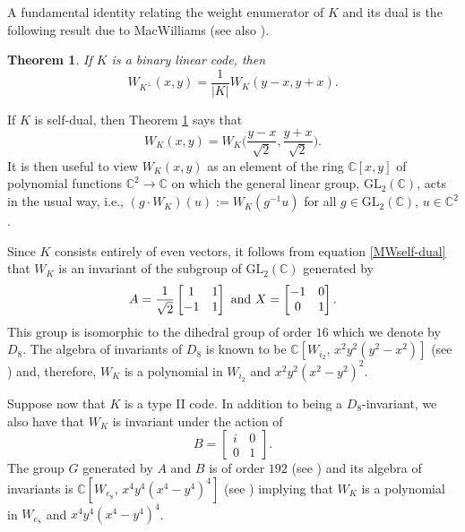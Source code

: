 \documentclass[a4paper,reqno]{amsart}
\newcommand{\bydef}{:=}
\newcommand{\CC}{\mathbb{C}}
\newcommand{\GL}{\mathrm{GL}}
\newtheorem{theorem}{Theorem}[section]
\theoremstyle{definition}
\theoremstyle{remark} \newtheorem{remark}[theorem]{Remark}
\numberwithin{equation}{section}
\begin{document}
A fundamental identity relating the weight enumerator of \(K\) and its dual is the following result due to MacWilliams \cite{MW} (see also \cite[\S8.7]{Adam}).
\begin{theorem}\label{MacWilliams}
    If \(K\) is a binary linear code, then
    \begin{equation*}
        W_{K^\perp}(x,y) = \frac{1}{\lvert K \rvert} W_K(y-x, y+x).
    \end{equation*}
\end{theorem}
If \(K\) is self-dual, then Theorem \ref{MacWilliams} says that
\begin{equation}\label{MWself-dual}
    W_K(x,y) = W_K\biggl( \frac{y-x}{\sqrt{2}}, \frac{y+x}{\sqrt{2}} \biggr).
\end{equation}
It is then useful to view \(W_K(x,y)\) as an element of the ring $\CC[x,y]$ of polynomial functions \(\mathbb{C}^2 \to \mathbb{C}\) on which the general linear group, \(\GL_2(\mathbb{C})\), acts in the usual way, i.e., \((g \cdot W_K)(u) \bydef W_K(g^{-1}u)\) for all \(g \in \GL_2(\mathbb{C}),\, u \in \mathbb{C}^2\). 

Since \(K\) consists entirely of even vectors, it follows from equation \ref{MWself-dual} that \(W_K\) is an invariant of the subgroup of $\GL_2(\CC)$ generated by
\begin{equation*}
    A = \frac{1}{\sqrt{2}}
    \begin{bmatrix}
        1 & 1 \\
        -1 & 1
    \end{bmatrix}
    \textnormal{ and }
    X = 
    \begin{bmatrix}
        -1 & 0 \\
        0 & 1
    \end{bmatrix}.
\end{equation*}
This group is isomorphic to the dihedral group of order \(16\) which we denote by \(D_8\). The algebra of invariants of \(D_8\) is known to be \(\mathbb{C}[W_{i_2},\, x^2y^2(y^2 - x^2)]\) (see \cite[\S7.1]{NRS}) and, therefore, \(W_K\) is a polynomial in \(W_{i_2}\) and \(x^2y^2(x^2-y^2)^2\).

Suppose now that \(K\) is a type II code. In addition to being a \(D_8\)-invariant, we also have that \(W_K\) is invariant under the action of
\begin{equation*}
    B = 
    \begin{bmatrix}
        i & 0 \\
        0 & 1
    \end{bmatrix}.
\end{equation*}
The group \(G\) generated by \(A\) and \(B\) is of order \(192\) (see \cite[\S6.2]{NRS}) and its algebra of invariants is \(\mathbb{C}[W_{e_8},\, x^4y^4(x^4 - y^4)^4]\) (see \cite[\S6.1]{NRS}) implying that \(W_K\) is a polynomial in \(W_{e_8}\) and \(x^4y^4(x^4 - y^4)^4\).
\end{document}
